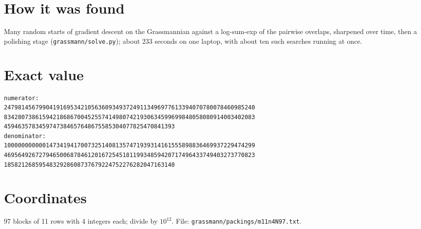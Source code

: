 \documentclass[11pt,a4paper]{article}
\begin{document}
\section{How it was found}
Many random starts of gradient descent on the Grassmannian against a log-sum-exp of the pairwise overlaps, sharpened over time, then a polishing stage (\texttt{grassmann/solve.py}); about 233 seconds on one laptop, with about ten such searches running at once.


\appendix
\section{Exact value}
{\small
\begin{verbatim}
numerator:
247981456799041916953421056360934937249113496977613394070780078460985240
834280738615942186867004525574149807421930634599699848058080914003402083
4594635783459747384657648675585304077825470841393
denominator:
100000000000147341941700732514081357471939314161555898836469937229474299
469564926727946500687846120167254518119934859420717496433749403273770823
1858212685954832928608737679224752276282047163140
\end{verbatim}}

\section{Coordinates}
97 blocks of 11 rows with 4 integers each; divide by $10^{12}$. File: \texttt{grassmann/packings/m11n4N97.txt}.
{\tiny
\begin{multicols}{3}
\end{multicols}}
\end{document}
